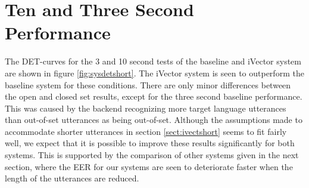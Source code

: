 

\section{Ten and Three Second Performance}


The DET-curves for the 3 and 10 second tests of the baseline and iVector system are shown in figure \ref{fig:sysdetshort}. The iVector system is seen to outperform the baseline system for these conditions.  There are only minor differences between the open and closed set results, except for the three second baseline performance. This was caused by the backend recognizing more target language utterances than out-of-set utterances as being out-of-set. Although the assumptions made to accommodate shorter utterances in section \ref{sect:ivectshort} seems to fit fairly well, we expect that it is possible to improve these results significantly for both systems. This is supported by the comparison of other systems given in the next section, where the EER for our systems are seen to deteriorate faster when the length of the utterances are reduced.

